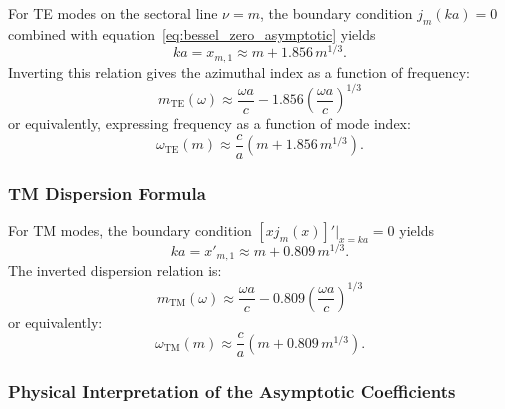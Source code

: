 \documentclass[
  aip,
  amsmath,amssymb,
  preprint
]{revtex4-1}
\begin{document}
For TE modes on the sectoral line $\nu = m$, the boundary condition $j_m(ka) = 0$ combined 
with equation~\eqref{eq:bessel_zero_asymptotic} yields
\begin{equation}
ka = x_{m,1} \approx m + 1.856 \, m^{1/3}.
\end{equation}
Inverting this relation gives the azimuthal index as a function of frequency:
\begin{equation}
\boxed{m_{\text{TE}}(\omega) \approx \frac{\omega a}{c} - 1.856 \left(\frac{\omega a}{c}\right)^{1/3}}
\label{eq:dispersion_m_omega_TE}
\end{equation}
or equivalently, expressing frequency as a function of mode index:
\begin{equation}
\omega_{\text{TE}}(m) \approx \frac{c}{a}\left(m + 1.856 \, m^{1/3}\right).
\label{eq:dispersion_omega_m_TE}
\end{equation}

\subsubsection{TM Dispersion Formula}

For TM modes, the boundary condition $[xj_m(x)]'|_{x=ka} = 0$ yields
\begin{equation}
ka = x'_{m,1} \approx m + 0.809 \, m^{1/3}.
\end{equation}
The inverted dispersion relation is:
\begin{equation}
\boxed{m_{\text{TM}}(\omega) \approx \frac{\omega a}{c} - 0.809 \left(\frac{\omega a}{c}\right)^{1/3}}
\label{eq:dispersion_m_omega_TM}
\end{equation}
or equivalently:
\begin{equation}
\omega_{\text{TM}}(m) \approx \frac{c}{a}\left(m + 0.809 \, m^{1/3}\right).
\label{eq:dispersion_omega_m_TM}
\end{equation}

\subsubsection{Physical Interpretation of the Asymptotic Coefficients}
\end{document}
